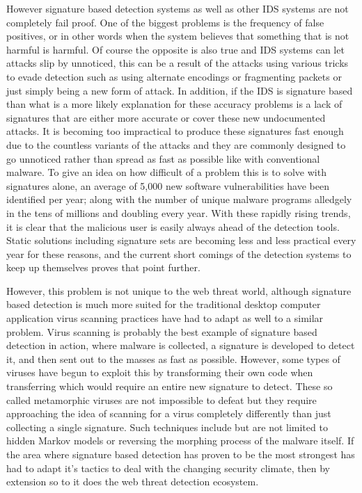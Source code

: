 However signature based detection systems as well as other IDS systems are not completely fail proof.  One of the biggest problems is the frequency of false positives, or in other words when the system believes that something that is not harmful is harmful.  Of course the opposite is also true and IDS systems can let attacks slip by unnoticed, this can be a result of the attacks using various tricks to evade detection such as using alternate encodings or fragmenting packets or just simply being a new form of attack. \cite{onTheVerification}  In addition, if the IDS is signature based than what is a more likely explanation for these accuracy problems is a lack of signatures that are either more accurate or cover these new undocumented attacks.  It is becoming too impractical to produce these signatures fast enough due to the countless variants of the attacks and they are commonly designed to go unnoticed rather than spread as fast as possible like with conventional malware. \cite{trendMicro}  To give an idea on how difficult of a problem this is to solve with signatures alone, an average of 5,000 new software vulnerabilities have been identified per year; along with the number of unique malware programs alledgely in the tens of millions and doubling every year.  With these rapidly rising trends, it is clear that the malicious user is easily always ahead of the detection tools.  Static solutions including signature sets are becoming less and less practical every year for these reasons, and the current short comings of the detection systems to keep up themselves proves that point further. \cite{onTheVerification}

However, this problem is not unique to the web threat world, although signature based detection is much more suited for the traditional desktop computer application virus scanning practices have had to adapt as well to a similar problem.  Virus scanning is probably the best example of signature based detection in action, where malware is collected, a signature is developed to detect it, and then sent out to the masses as fast as possible.  However, some types of viruses have begun to exploit this by transforming their own code when transferring which would require an entire new signature to detect.  These so called metamorphic viruses are not impossible to defeat but they require approaching the idea of scanning for a virus completely differently than just collecting a single signature.  Such techniques include but are not limited to hidden Markov models or reversing the morphing process of the malware itself. \cite{metaInvincible} \cite{metaHunting}  If the area where signature based detection has proven to be the most strongest has had to adapt it's tactics to deal with the changing security climate, then by extension so to it does the web threat detection ecosystem.

